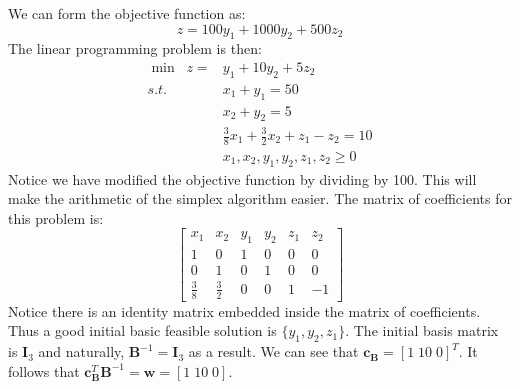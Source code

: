 \begin{example}
We can form the objective function as:
\begin{equation}
z = 100y_1 + 1000y_2 + 500z_2
\end{equation}
The linear programming problem is then:
\begin{equation}
\begin{aligned}
\min\;\;z = & y_1 + 10y_2 + 5z_2\\
s.t.\;\;& x_1 + y_1 = 50\\
		& x_2 + y_2 = 5\\
		& \frac{3}{8}x_1 + \frac{3}{2}x_2 + z_1 - z_2 = 10\\
		& x_1, x_2, y_1, y_2, z_1, z_2 \geq 0
\end{aligned}
\end{equation}
Notice we have modified the objective function by dividing by 100. This will make the arithmetic of the simplex algorithm easier. The matrix of coefficients for this problem is:
\begin{equation}
\begin{bmatrix}
x_1 & x_2 & y_1 & y_2 & z_1 & z_2\\
\hline 
1 	& 0   	 & 1 & 0 & 0 & 0\\
0 	& 1   	 & 0 & 1 & 0 & 0\\
\frac{3}{8} & \frac{3}{2} & 0 & 0 & 1 & -1
\end{bmatrix}
\end{equation}
Notice there is an identity matrix embedded inside the matrix of coefficients. Thus a good initial basic feasible solution is $\{y_1, y_2, z_1\}$. The initial basis matrix is $\mathbf{I}_3$ and naturally, 
$\mathbf{B}^{-1} = \mathbf{I}_3$ as a result. We can see that $\mathbf{c_B} = [1\; 10\; 0]^T$. It follows that $\mathbf{c}_\mathbf{B}^T\mathbf{B}^{-1} = \mathbf{w} = [1\; 10\; 0]$.


\end{example}

